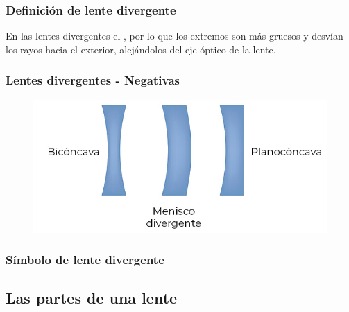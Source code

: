 \documentclass[14pt]{beamer}
\begin{document}
\begin{frame}
\frametitle{Definición de lente divergente}
En las lentes divergentes el , \pause por lo que los extremos son más gruesos y desvían los rayos hacia el exterior, alejándolos del eje óptico de la lente.
\end{frame}
\begin{frame}
\frametitle{Lentes divergentes - Negativas}
\begin{figure}
    \centering
    \includegraphics[scale=2]{Imagenes/Lentes_divergentes_01.jpg}
\end{figure}
\end{frame}
\begin{frame}
\frametitle{Símbolo de lente divergente}
\begin{figure}
    \centering
\end{figure}
\end{frame}

\subsection{Las partes de una lente}
\end{document}
